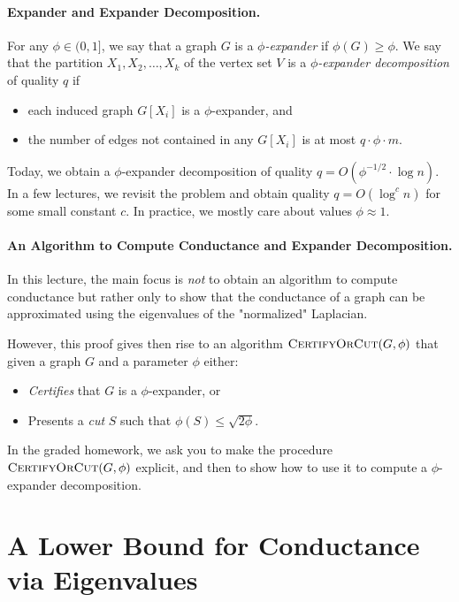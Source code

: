 \paragraph{Expander and Expander Decomposition.} For any $\phi \in (0, 1]$, we say that a graph $G$ is a \emph{$\phi$-expander} if $\phi(G) \geq \phi$. We say that the partition $X_1, X_2, \dots, X_k$ of the vertex set $V$ is a \emph{$\phi$-expander decomposition} of quality $q$ if
\begin{itemize}
    \item each induced graph $G[X_i]$ is a $\phi$-expander, and
    \item the number of edges not contained in any $G[X_i]$ is at most $q \cdot \phi \cdot m$.
\end{itemize}
Today, we obtain a $\phi$-expander decomposition of quality $q = O(\phi^{-1/2} \cdot \log n)$. In a few lectures, we revisit the problem and obtain quality $q = O(\log^c n)$ for some small constant $c$. In practice, we mostly care about values $\phi \approx 1$.

\paragraph{An Algorithm to Compute Conductance and Expander Decomposition.} 
In this lecture, the main focus is \emph{not} to obtain an algorithm to compute conductance but rather only to show that the conductance of a graph can be approximated using the eigenvalues of the "normalized" Laplacian. 

However, this proof gives then rise to an algorithm $\textsc{CertifyOrCut}(G, \phi)$ that given a graph $G$ and a parameter $\phi$ either: 
\begin{itemize}
    \item \emph{Certifies} that $G$ is a $\phi$-expander, or
    \item Presents a \emph{cut} $S$ such that $\phi(S) \leq \sqrt{2\phi}$.
\end{itemize}
In the graded homework, we ask you to make the procedure $\textsc{CertifyOrCut}(G, \phi)$ explicit, and then to show how to use it to compute a $\phi$-expander decomposition. 

\section{A Lower Bound for Conductance via Eigenvalues}

